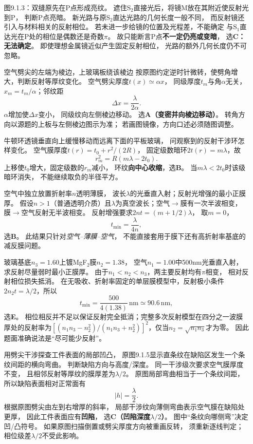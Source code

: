 \problemtext 图9.1.3：双缝原先在P点形成亮纹。
遮住S$_2$直接光后，将镜M放在其附近使反射光到P，
判断P点亮暗。
\workings
新光路与原S$_2$直达光路的几何长度一般不同，
而反射镜还引入与材料相关的反射相位。
若未进一步给镜的位置及光程差，不能确定
与S$_1$直达光在P处的相位是偶数还是奇数$\pi$。
故只能断言P点\textbf{不一定仍亮或变暗}，
选\textbf{C：无法确定}。
\crosscheck 即使理想金属镜近似产生固定反射相位，
光路的额外几何长度仍不可忽略。

\problemtext 空气劈尖的左端为棱边，上玻璃板绕该棱边
按原图约定逆时针微转，使劈角增大，判断反射等厚纹变化。
\workings
空气劈尖厚度$t(x)\simeq\alpha x$，
同级厚度$t_m$与角$\alpha$无关，
$x_m=t_m/\alpha$；邻纹距
\[
\Delta x=\frac{\lambda}{2\alpha}.
\]
$\alpha$增加使$\Delta x$变小，
同级纹向左侧棱边移动。
选\textbf{A（变密并向棱边移动）}。
\crosscheck 转角方向以源题的上板与左侧棱边图示为准；
若画图镜像，方向口述必须随图调整。

\problemtext 牛顿环透镜垂直向上缓慢移动而远离下面的平板玻璃，
问观察到的反射干涉环怎样变化。
\workings
空气膜厚度$t(r)=t_0+r^2/(2R)$，
固定级数暗环$2t(r)=m\lambda$，故
\[
r_m^2=R(m\lambda-2t_0).
\]
上移使$t_0$增大，固定级数的$r_m$减小，
环纹\textbf{向中心收缩}，选\textbf{B}。
\crosscheck 当$m\lambda<2t_0$时该级暗环消失，
不能继续取负的半径平方。

\problemtext 空气中独立放置折射率$n$透明薄膜，
波长$\lambda$的光垂直入射；反射光增强的最小正膜厚。
\workings
假设$n>1$（普通透明介质）且$\lambda$为真空波长；空气$\to$膜有一次半波相变，
膜$\to$空气反射无半波相变。
反射增强要求$2nt=(m+1/2)\lambda$，
取$m=0$，
\[
\boxed{t_{\min}=\frac{\lambda}{4n}},
\]
选\textbf{B}。
\crosscheck 此结果只针对\emph{空气--薄膜--空气}，
不能直接套用于膜下还有高折射率基底的减反膜问题。

\problemtext 玻璃基底$n_3=1.60$上镀MgF$_2$膜$n_2=1.38$，
空气$n_1=1.00$中500nm光垂直入射，求反射尽量弱时最小正膜厚。
\workings
由于$n_1<n_2<n_3$，两主要反射均有$\pi$相变，
相对反射相位损失抵消。
在无吸收、折射率固定的单层膜模型中，反射极小条件$2n_2t=\lambda/2$，所以
\[
\boxed{t_{\min}=\frac{500}{4(1.38)}\,\mathrm{nm}
\simeq90.6\,\mathrm{nm}},
\]
选\textbf{E}。
\crosscheck 相位相反并不足以保证反射完全抵消；完整多次反射模型在四分之一波膜厚处的反射率为$[(n_1n_3-n_2^2)/(n_1n_3+n_2^2)]^2$，仅当$n_2=\sqrt{n_1n_3}$才为零。
因此题面准确说法是“尽可能少反射”。

\problemtext 用劈尖干涉探查工件表面的局部凹凸，
原图9.1.5显示直条纹在缺陷区发生一个条纹间距的横向弯曲。
判断缺陷方向与高度/深度。
\workings
同一干涉级次要求空气膜厚度不变，
且相邻反射等厚纹的膜厚差为$\lambda/2$。
原图局部弯曲相当于一个条纹间距，
所以缺陷表面相对正常面有
\[
\boxed{|h|=\frac{\lambda}{2}}.
\]
根据原图劈尖由左到右增厚的斜率，
局部干涉纹向薄侧弯曲表示空气膜在缺陷处更厚，
因此工件表面应有\textbf{凹陷}，
选\textbf{C（凹陷深度$\lambda/2$）}。
\crosscheck 图中“条纹向哪侧弯”决定凹/凸符号。
如果原图扫描倒置或劈尖厚度方向被重画反转，
须重新逐线判定；相位级差$\lambda/2$不受此影响。

